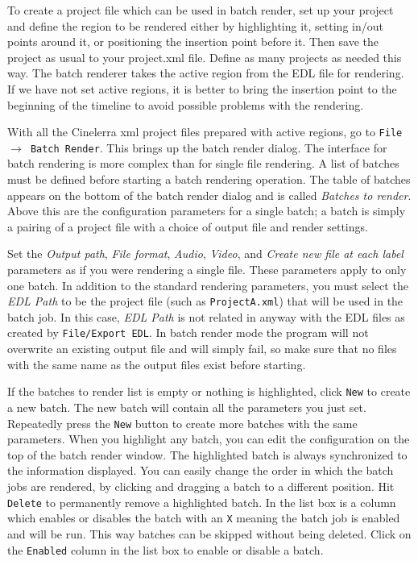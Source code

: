 To create a project file which can be used in batch render, set up your project and define the region to be rendered either by highlighting it, setting in/out points around it, or positioning the insertion point before it. Then save the project as usual to your project.xml file. Define as many projects as needed this way.  The batch renderer takes the active region from the EDL file for rendering. If we have not set active regions, it is better to bring the insertion point to the beginning of the timeline to avoid possible problems with the rendering.

With all the Cinelerra xml project files prepared with active regions, go to \texttt{File $\rightarrow$ Batch Render}. This brings up the batch render dialog. The interface for batch rendering is more complex than for single file rendering.  A list of batches must be defined before starting a batch rendering operation.  The table of batches appears on the bottom of the batch render dialog and is called \textit{Batches to render}.  Above this are the configuration parameters for a single batch; a batch is simply a pairing of a project file with a choice of output file and render settings.

Set the \textit{Output path}, \textit{File format}, \textit{Audio}, \textit{Video}, and \textit{Create new file at each label} parameters as if you were rendering a single file.  These parameters apply to only one batch.  In addition to the standard rendering parameters, you must select the \textit{EDL Path} to be the project file (such as \texttt{ProjectA.xml}) that will be used in the batch job.  In this case, \textit{EDL Path} is not related in anyway with the EDL files as created by \texttt{File/Export EDL}.  In batch render mode the program will not overwrite an existing output file and will simply fail, so make sure that no files with the same name as the output files exist before starting.

If the batches to render list is empty or nothing is highlighted, click \texttt{New} to create a new batch. The new batch will contain all the parameters you just set.  Repeatedly press the \texttt{New} button to create more batches with the same parameters.  When you highlight any batch, you can edit the configuration on the top of the batch render window. The highlighted batch is always synchronized to the information displayed.  You can easily change the order in which the batch jobs are rendered, by clicking and dragging a batch to a different position.  Hit \texttt{Delete} to permanently remove a highlighted batch. In the list box is a column which enables or disables the batch with an \texttt{X} meaning the batch job is enabled and will be run.  This way batches can be skipped without being deleted.  Click on the \texttt{Enabled} column in the list box to enable or disable a batch.

